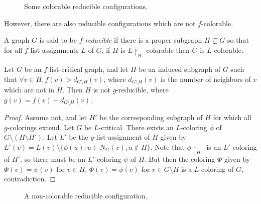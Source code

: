 \begin{figure}

\centering
\begin{subfigure}{0.4\textwidth}
\begin{tikzpicture}

\label{fig:reducible1}
\end{tikzpicture}
\end{subfigure}
\begin{subfigure}{0.4\textwidth}
\begin{tikzpicture}

\end{tikzpicture}
\label{fig:reducible2}
\end{subfigure}
\caption{Some colorable reducible configurations.}
\label{fig:colorablereducible}
\end{figure}

However, there are also reducible configurations which are not $f$-colorable.

\begin{definition}
A graph $G$ is said to be \emph{$f$-reducible} if there is a proper subgraph $H \subsetneq G$ so that
for all $f$-list-assignments $L$ of $G$, if $H$ is $L\restriction_H$-colorable then $G$ is $L$-colorable. 
\end{definition}

\begin{proposition}
Let $G$ be an $f$-list-critical graph, and let $H$ be an induced subgraph of $G$ such that $\forall v \in H, f(v) > d_{G\setminus H}(v)$,
where $d_{G \setminus H}(v)$ is the number of neighbors of $v$ which are not in $H$. Then $H$ is not $g$-reducible, where $g(v) = f(v) -d_{G\setminus H}(v)$.
\end{proposition}

\begin{proof}
Assume not, and let $H'$ be the corresponding subgraph of $H$ for which all $g$-colorings extend. Let $G$ be $L$-critical. 
There exists an $L$-coloring $\phi$ of $G \setminus (H \setminus H')$. Let $L'$ be the $g$-list-assignment of $H$ given by 
$L'(v) = L(v) \setminus \{\phi(u) : u \in N_G(v), u \not\in H\}$. Note that $\phi\restriction_{H'}$ is an $L'$-coloring of $H'$, so there must
be an $L'$-coloring $\psi$ of $H$. But then the coloring $\Phi$ given by $\Phi(v) = \psi(v)$ for $v \in H$, $\Phi(v) = \phi(v)$ for $v \in G \setminus H$ is 
a $L$-coloring of $G$, contradiction. 
\end{proof}

\begin{figure}

\centering
\begin{tikzpicture}

\end{tikzpicture}
\caption{A non-colorable reducible configuration.}
\label{fig:noncolorablereducible}
\end{figure}

